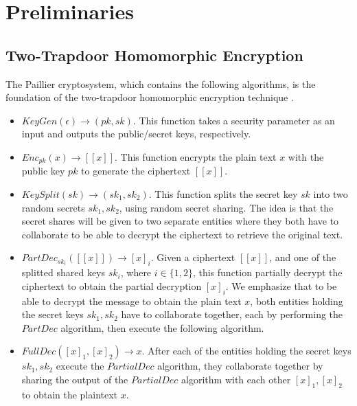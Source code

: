 \section{Preliminaries}
\label{sec:preliminaries}

\subsection{Two-Trapdoor Homomorphic Encryption}
\label{sec:preliminary-he}

The Paillier cryptosystem, which contains the following algorithms, is the foundation of the two-trapdoor homomorphic encryption technique \cite{liu2016efficient}.

\begin{itemize}
    \item $KeyGen(\epsilon) \rightarrow (pk, sk)$.
    This function takes a security parameter as an input and outputs the public/secret keys, respectively.
    \item $Enc_{pk}(x) \rightarrow [[x]]$.
    This function encrypts the plain text $x$ with the public key $pk$ to generate the ciphertext $[[x]]$.
    \item $KeySplit(sk) \rightarrow (sk_1, sk_2)$.
    This function splits the secret key $sk$ into two random secrets $sk_1, sk_2$, using random secret sharing.
    The idea is that the secret shares will be given to two separate entities where they both have to collaborate to be able to decrypt the ciphertext to retrieve the original text.
    \item $PartDec_{sk_i}([[x]]) \rightarrow [x]_i$.
    Given a ciphertext $[[x]]$, and one of the splitted shared keys $sk_i$, where $i \in \{ 1, 2\}$, this function partially decrypt the ciphertext to obtain the partial decryption $[x]_i$.
    We emphasize that to be able to decrypt the message to obtain the plain text $x$, both entities holding the secret keys $sk_1, sk_2$ have to collaborate together, each by performing the $PartDec$ algorithm, then execute the following algorithm.
    \item $FullDec([x]_1, [x]_2) \rightarrow x$.
    After each of the entities holding the secret keys $sk_1, sk_2$ execute the $PartialDec$ algorithm, they collaborate together by sharing the output of the $PartialDec$ algorithm with each other $[x]_1, [x]_2$ to obtain the plaintext $x$.
\end{itemize}

